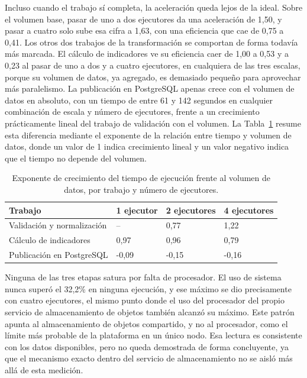 Incluso cuando el trabajo sí completa, la aceleración queda lejos de la
ideal. Sobre el volumen base, pasar de uno a dos ejecutores da una
aceleración de 1,50, y pasar a cuatro solo sube esa cifra a 1,63, con una
eficiencia que cae de 0,75 a 0,41. Los otros dos trabajos de la
transformación se comportan de forma todavía más marcada. El cálculo de
indicadores ve su eficiencia caer de 1,00 a 0,53 y a 0,23 al pasar de uno
a dos y a cuatro ejecutores, en cualquiera de las tres escalas, porque su
volumen de datos, ya agregado, es demasiado pequeño para aprovechar más
paralelismo. La publicación en PostgreSQL apenas crece con el volumen de
datos en absoluto, con un tiempo de entre 61 y 142 segundos en cualquier
combinación de escala y número de ejecutores, frente a un crecimiento
prácticamente lineal del trabajo de validación con el volumen. La
Tabla~\ref{tab:tfm_benchmark_exponentes} resume esta diferencia mediante
el exponente de la relación entre tiempo y volumen de datos, donde un
valor de 1 indica crecimiento lineal y un valor negativo indica que el
tiempo no depende del volumen.

\begin{table}[H]
  \centering
  \small
  \renewcommand{\arraystretch}{1.2}
  \begin{tabular}{
    >{\raggedright\arraybackslash}p{}
    p{} p{} p{}}
    \hline
    \textbf{Trabajo} & \textbf{1 ejecutor} & \textbf{2 ejecutores} & \textbf{4 ejecutores} \\
    \hline
    Validación y normalización & -- & 0,77 & 1,22 \\
    Cálculo de indicadores & 0,97 & 0,96 & 0,79 \\
    Publicación en PostgreSQL & -0,09 & -0,15 & -0,16 \\
    \hline
  \end{tabular}
  \caption{Exponente de crecimiento del tiempo de ejecución frente al
  volumen de datos, por trabajo y número de ejecutores.}
  \label{tab:tfm_benchmark_exponentes}
\end{table}

Ninguna de las tres etapas satura por falta de procesador. El uso de
sistema nunca superó el 32,2\% en ninguna ejecución, y ese máximo se dio
precisamente con cuatro ejecutores, el mismo punto donde el uso del
procesador del propio servicio de almacenamiento de objetos también
alcanzó su máximo. Este patrón apunta al almacenamiento de objetos
compartido, y no al procesador, como el límite más probable de la
plataforma en un único nodo. Esa lectura es consistente con los datos
disponibles, pero no queda demostrada de forma concluyente, ya que el
mecanismo exacto dentro del servicio de almacenamiento no se aisló más
allá de esta medición.

